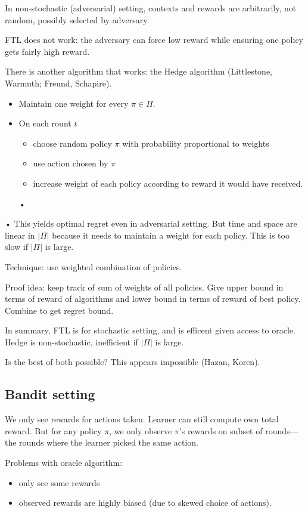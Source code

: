 In non-stochastic (adversarial) setting, contexts and rewards are arbitrarily, not random, possibly selected by adversary.

FTL does not work: the adversary can force low reward while ensuring one policy gets fairly high reward.

There is another algorithm that works: the Hedge algorithm (Littlestone, Warmuth; Freund, Schapire). 
\begin{itemize}
\item
Maintain one weight for every $\pi\in \Pi$.
\item
On each rount $t$
\begin{itemize}
\item
choose random policy $\pi$ with probability proportional to weights
\item
use action chosen by $\pi$
\item
increase weight of each policy according to reward it would have received.
\end{itemize}•
\end{itemize}•
This yields optimal regret even in adversarial setting. But time and space are linear in $|\Pi|$ because it needs to maintain a weight for each policy. This is too slow if $|\Pi|$ is large.

Technique: use weighted combination of policies.

Proof idea: keep track of sum of weights of all policies. Give upper bound in terms of reward of algorithms and lower bound in terms of reward of best policy. Combine to get regret bound.

In summary, FTL is for stochastic setting, and is efficent given access to oracle. Hedge is non-stochastic, inefficient if $|\Pi|$ is large. 

Is the best of both possible? This appears impossible (Hazan, Koren).

\subsection{Bandit setting}

We only see rewards for actions taken.
Learner can still compute own total reward. 
But for any policy $\pi$, we only observe $\pi$'s rewards on subset of rounds---the rounds where the learner picked the same action.

Problems with oracle algorithm:
\begin{itemize}
\item
only see some rewards
\item
observed rewards are highly biased (due to skewed choice of actions).
\end{itemize}

